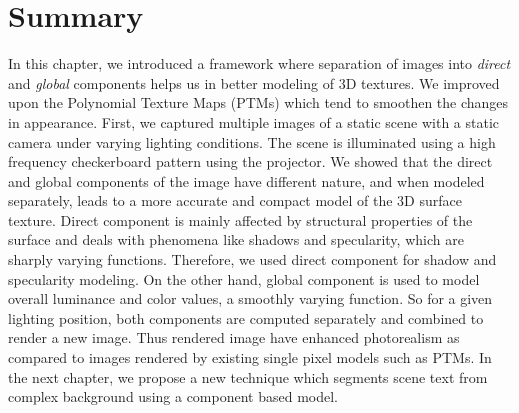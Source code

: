\section{Summary}
In this chapter, we introduced a framework where separation of images 
into {\em direct} and {\em global} components helps us in better modeling of 3D textures.
We improved upon the Polynomial Texture Maps (PTMs) which
tend to smoothen the changes in appearance.
First, we captured multiple images of a static scene with a static camera under varying
lighting conditions.
The scene is illuminated using a high frequency checkerboard pattern using the projector. 
We showed that the direct and global components of the image
have different nature, and when modeled separately, leads to a more accurate and
compact model of the 3D surface texture. Direct component is mainly affected by
structural properties of the surface and deals with phenomena like
shadows and specularity, which are sharply varying functions. 
Therefore, we used direct component for shadow and specularity modeling.
On the other hand, global
component is used to model overall luminance and color values, a smoothly
varying function. 
So for a given lighting position, both components are computed
separately and combined to render a new image.
Thus rendered image have enhanced photorealism as compared to images rendered by
existing single pixel models such as PTMs. In the next chapter, we propose a new
technique which segments scene text from complex background using a component based model.
